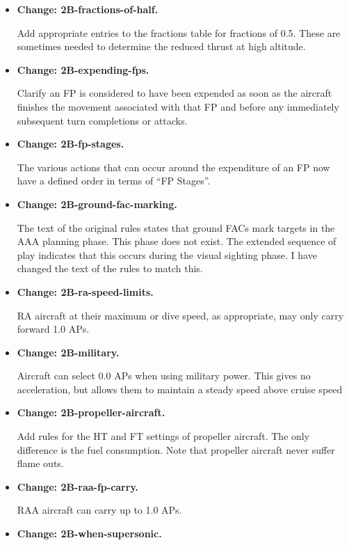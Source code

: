 \documentclass{report}
\newcommand{\changetag}[1]{\textbf{Change: #1.}\par}
\begin{document}
\begin{itemize}
    \item\changetag{2B-fractions-of-half}

        Add appropriate entries to the fractions table for fractions of 0.5. These are sometimes needed to determine the reduced thrust at high altitude.

    \item\changetag{2B-expending-fps}

        Clarify an FP is considered to have been expended as soon as the aircraft finishes the movement associated with that FP and before any immediately subsequent turn completions or attacks.

    \item\changetag{2B-fp-stages}

        The various actions that can occur around the expenditure of an FP now have a defined order in terms of “FP Stages”.

    \item\changetag{2B-ground-fac-marking}

        The text of the original rules states that ground FACs mark targets in the AAA planning phase. This phase does not exist. The extended sequence of play indicates that this occurs during the visual sighting phase. I have changed the text of the rules to match this.

    \item\changetag{2B-ra-speed-limits}

        RA aircraft at their maximum or dive speed, as appropriate, may only carry forward 1.0 APs.

    \item\changetag{2B-military}

        Aircraft can select 0.0 APs when using military power. This gives no acceleration, but allows them to maintain a steady speed above cruise speed

    \item\changetag{2B-propeller-aircraft}

        Add rules for the HT and FT settings of propeller aircraft. The only difference is the fuel consumption. Note that propeller aircraft never suffer flame outs.

    \item\changetag{2B-raa-fp-carry}

        {RAA aircraft can carry up to 1.0 APs.}

    \item\changetag{2B-when-supersonic}


\end{itemize}
\end{document}
